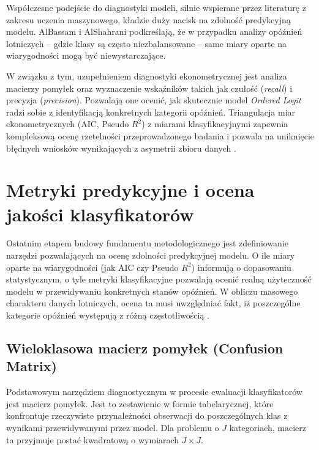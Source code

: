 Współczesne podejście do diagnostyki modeli, silnie wspierane przez literaturę z zakresu uczenia maszynowego, kładzie duży nacisk na zdolność predykcyjną modelu. AlBassam i AlShahrani \cite{albassam2025} podkreślają, że w przypadku analizy opóźnień lotniczych – gdzie klasy są często niezbalansowane – same miary oparte na wiarygodności mogą być niewystarczające.

W związku z tym, uzupełnieniem diagnostyki ekonometrycznej jest analiza macierzy pomyłek oraz wyznaczenie wskaźników takich jak czułość (\textit{recall}) i precyzja (\textit{precision}). Pozwalają one ocenić, jak skutecznie model \textit{Ordered Logit} radzi sobie z identyfikacją konkretnych kategorii opóźnień. Triangulacja miar ekonometrycznych (AIC, Pseudo $R^2$) z miarami klasyfikacyjnymi zapewnia kompleksową ocenę rzetelności przeprowadzonego badania i pozwala na uniknięcie błędnych wniosków wynikających z asymetrii zbioru danych \cite{albassam2025, jackowska2011}.

\section{Metryki predykcyjne i ocena jakości klasyfikatorów}

Ostatnim etapem budowy fundamentu metodologicznego jest zdefiniowanie narzędzi pozwalających na ocenę zdolności predykcyjnej modelu. O ile miary oparte na wiarygodności (jak AIC czy Pseudo $R^2$) informują o dopasowaniu statystycznym, o tyle metryki klasyfikacyjne pozwalają ocenić realną użyteczność modelu w przewidywaniu konkretnych stanów opóźnień. W obliczu masowego charakteru danych lotniczych, ocena ta musi uwzględniać fakt, iż poszczególne kategorie opóźnień występują z różną częstotliwością \cite{albassam2025}.

\subsection{Wieloklasowa macierz pomyłek (Confusion Matrix)}

Podstawowym narzędziem diagnostycznym w procesie ewaluacji klasyfikatorów jest macierz pomyłek. Jest to zestawienie w formie tabelarycznej, które konfrontuje rzeczywiste przynależności obserwacji do poszczególnych klas z wynikami przewidywanymi przez model. Dla problemu o $J$ kategoriach, macierz ta przyjmuje postać kwadratową o wymiarach $J \times J$. 

